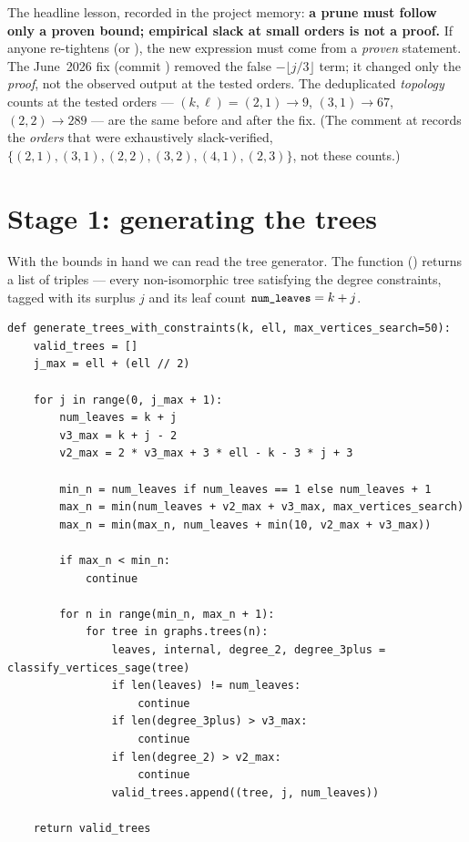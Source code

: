 \begin{gotcha}
\label{gotcha:proof-not-slack}
The headline lesson, recorded in the project memory: \textbf{a prune must follow
only a proven bound; empirical slack at small orders is not a proof.} If anyone
re-tightens  (or ), the new expression must come from a
\emph{proven} statement. The June~2026 fix (commit ) removed the
false $-\lfloor j/3\rfloor$ term; it changed only the \emph{proof}, not the
observed output at the tested orders. The deduplicated \emph{topology} counts at the tested orders ---
$(k,\ell)=(2,1)\to 9$, $(3,1)\to 67$, $(2,2)\to 289$ --- are the same before and
after the fix. (The comment at  records
the \emph{orders} that were exhaustively slack-verified,
$\{(2,1),(3,1),(2,2),(3,2),(4,1),(2,3)\}$, not these counts.)
\end{gotcha}

\section{Stage 1: generating the trees}

With the bounds in hand we can read the tree generator. The function
() returns a list of triples
 --- every non-isomorphic tree satisfying the degree
constraints, tagged with its surplus $j$ and its leaf count $\texttt{\small num\_leaves} =
k+j$.

\begin{lstlisting}
def generate_trees_with_constraints(k, ell, max_vertices_search=50):
    valid_trees = []
    j_max = ell + (ell // 2)

    for j in range(0, j_max + 1):
        num_leaves = k + j
        v3_max = k + j - 2
        v2_max = 2 * v3_max + 3 * ell - k - 3 * j + 3

        min_n = num_leaves if num_leaves == 1 else num_leaves + 1
        max_n = min(num_leaves + v2_max + v3_max, max_vertices_search)
        max_n = min(max_n, num_leaves + min(10, v2_max + v3_max))

        if max_n < min_n:
            continue

        for n in range(min_n, max_n + 1):
            for tree in graphs.trees(n):
                leaves, internal, degree_2, degree_3plus = classify_vertices_sage(tree)
                if len(leaves) != num_leaves:
                    continue
                if len(degree_3plus) > v3_max:
                    continue
                if len(degree_2) > v2_max:
                    continue
                valid_trees.append((tree, j, num_leaves))

    return valid_trees
\end{lstlisting}

